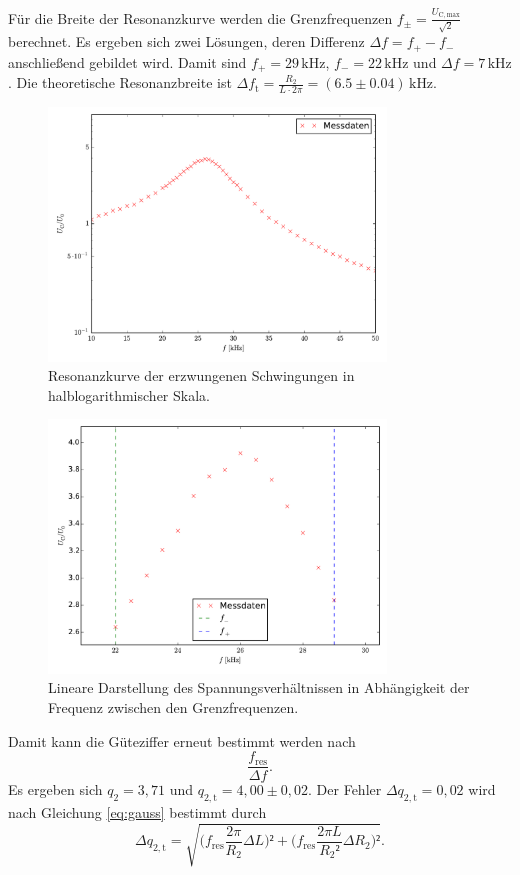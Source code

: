 Für die Breite der Resonanzkurve werden die Grenzfrequenzen $f_\pm=\frac{U_\mathup{C,max}}{\sqrt{2}}$ berechnet. Es ergeben sich zwei Lösungen, deren Differenz $\Delta{f}=f_+-f_-$ anschließend gebildet wird. 
Damit sind $f_+=29\,\si{\kilo\hertz}$, $f_-=22\,\si{\kilo\hertz}$ und $\Delta{f}=7\,\si{\kilo\hertz}$. 
Die theoretische Resonanzbreite ist $\Delta{f_\mathup{t}}=\frac{R_2}{L\cdot2\pi}=(6.5\pm0.04)\,\si{\kilo\hertz}$. 
\begin{figure}[h]
		\centering
		\includegraphics[width=0.8\textwidth]{build/plot_amplitude_semilog.pdf}
		\caption{Resonanzkurve der erzwungenen Schwingungen in halblogarithmischer Skala.\cite{matplotlib}}
\end{figure}
\begin{figure}[h]
		\centering
		\includegraphics[width=0.8\textwidth]{build/plot_amplitude_linear.pdf}
		\caption{Lineare Darstellung des Spannungsverhältnissen in Abhängigkeit der Frequenz zwischen den Grenzfrequenzen.\cite{matplotlib}}
\end{figure}
Damit kann die Güteziffer erneut bestimmt werden nach 
\begin{equation}
\frac{f_\mathup{res}}{\Delta{f}}.
\label{eq:formel}
\end{equation}
 Es ergeben sich $q_2=3,71$ und $q_{2,\mathup{t}}=4,00\pm0,02$. Der Fehler $\Delta{q_{2,\mathup{t}}}=0,02$ wird nach Gleichung \eqref{eq:gauss}  bestimmt durch
\begin{equation}
\Delta{q_{2,\mathup{t}}}=\sqrt{\bigl(f_\mathup{res}\frac{2\pi}{R_2}\Delta{L}\bigr)²+\bigl(f_\mathup{res}\frac{2\pi L}{{R_2}²}\Delta{R_2}\bigr)²}.
\end{equation}

